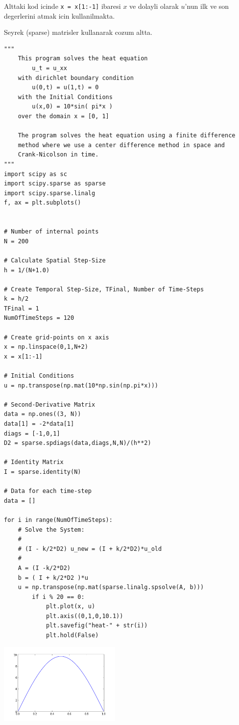 \documentclass[12pt,fleqn]{article}\usepackage{../common}
\begin{document}
Alttaki kod icinde \verb!x = x[1:-1]! ibaresi $x$ ve dolayli
olarak $u$'nun ilk ve son degerlerini atmak icin kullanilmakta.

Seyrek (sparse) matrisler kullanarak cozum altta.

\begin{verbatim}
"""
	This program solves the heat equation
		u_t = u_xx
	with dirichlet boundary condition
		u(0,t) = u(1,t) = 0
	with the Initial Conditions
		u(x,0) = 10*sin( pi*x )
	over the domain x = [0, 1]
 
	The program solves the heat equation using a finite difference
	method where we use a center difference method in space and
	Crank-Nicolson in time.
"""
import scipy as sc
import scipy.sparse as sparse
import scipy.sparse.linalg
f, ax = plt.subplots()

 
# Number of internal points
N = 200
 
# Calculate Spatial Step-Size
h = 1/(N+1.0)
 
# Create Temporal Step-Size, TFinal, Number of Time-Steps
k = h/2
TFinal = 1
NumOfTimeSteps = 120
 
# Create grid-points on x axis
x = np.linspace(0,1,N+2)
x = x[1:-1]

# Initial Conditions
u = np.transpose(np.mat(10*np.sin(np.pi*x)))
 
# Second-Derivative Matrix
data = np.ones((3, N))
data[1] = -2*data[1]
diags = [-1,0,1]
D2 = sparse.spdiags(data,diags,N,N)/(h**2)

# Identity Matrix
I = sparse.identity(N)
 
# Data for each time-step
data = []
 
for i in range(NumOfTimeSteps):
	# Solve the System: 
	#
	# (I - k/2*D2) u_new = (I + k/2*D2)*u_old
	#
	A = (I -k/2*D2)
	b = ( I + k/2*D2 )*u
	u = np.transpose(np.mat(sparse.linalg.spsolve(A, b)))
        if i % 20 == 0:
            plt.plot(x, u)
            plt.axis((0,1,0,10.1))
            plt.savefig("heat-" + str(i))
            plt.hold(False)
\end{verbatim}

\includegraphics[height=4cm]{heat-0.png}
\end{document}
